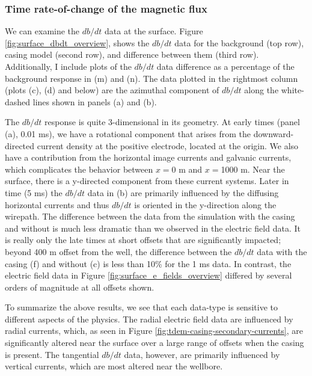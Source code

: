 \subsubsection{Time rate-of-change of the magnetic flux}

We can examine the $db/dt$ data at the surface. Figure \ref{fig:surface_dbdt_overview}, shows the $db/dt$ data for the background (top row), casing model (second row), and difference between them (third row). Additionally, I include plots of the $db/dt$ data difference as a percentage of the background response in (m) and (n). The data plotted in the rightmost column (plots (c), (d) and below) are the azimuthal component of $db/dt$ along the white-dashed lines shown in panels (a) and (b).





The $db/dt$ response is quite 3-dimensional in its geometry. At early times (panel (a), 0.01 ms), we have a rotational component that arises from the downward-directed current density at the positive electrode, located at the origin. We also have a contribution from the horizontal image currents and galvanic currents, which complicates the behavior between $x=$0 m and $x=$1000 m. Near the surface, there is a y-directed component from these current systems. Later in time (5 ms) the $db/dt$ data in (b) are primarily influenced by the diffusing horizontal currents and thus $db/dt$ is oriented in the y-direction along the wirepath. The difference between the data from the simulation with the casing and without is much less dramatic than we observed in the electric field data. It is really only the late times at short offsets that are significantly impacted; beyond 400 m offset from the well, the difference between the $db/dt$ data with the casing (f) and without (c) is less than 10\% for the 1 ms data. In contrast, the electric field data in Figure \ref{fig:surface_e_fields_overview} differed by several orders of magnitude at all offsets shown.

To summarize the above results, we see that each data-type is sensitive to different aspects of the physics. The radial electric field data are influenced by radial currents, which, as seen in Figure \ref{fig:tdem-casing-secondary-currents}, are significantly altered near the surface over a large range of offsets when the casing is present. The tangential $db/dt$ data, however, are primarily influenced by vertical currents, which are most altered near the wellbore.


